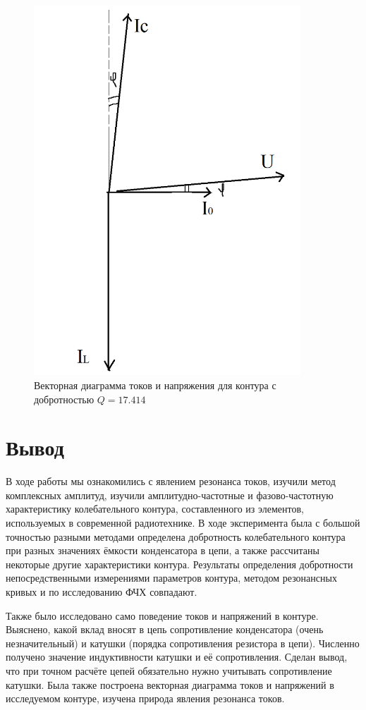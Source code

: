 \documentclass[a4paper]{article}
\begin{document}
\begin{enumerate}
    \begin{figure}[h]
    \centering
    \includegraphics[width=10cm]{graph4.png}
    \caption{Векторная диаграмма токов и напряжения для контура с добротностью $Q = 17.414$}
    \label{fig:vac}
\end{figure}
    
\end{enumerate}

\section{Вывод}
В ходе работы мы ознакомились с явлением резонанса токов, изучили метод комплексных амплитуд, изучили амплитудно-частотные и фазово-частотную характеристику колебательного контура, составленного из элементов, используемых в современной радиотехнике. В ходе эксперимента была с большой точностью разными методами определена добротность колебательного контура при разных значениях ёмкости конденсатора в цепи, а также рассчитаны некоторые другие характеристики контура. Результаты определения добротности непосредственными измерениями параметров контура, методом резонансных кривых и по исследованию ФЧХ совпадают. \par
Также было исследовано само поведение токов и напряжений в контуре. Выяснено, какой вклад вносят в цепь сопротивление конденсатора (очень незначительный) и катушки (порядка сопротивления резистора в цепи). Численно получено значение индуктивности катушки и её сопротивления. Сделан вывод, что при точном расчёте цепей обязательно нужно учитывать сопротивление катушки. Была также построена векторная диаграмма токов и напряжений в исследуемом контуре, изучена природа явления резонанса токов.
\end{document}
